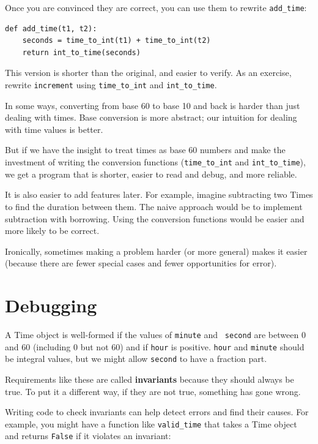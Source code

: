 \documentclass[10pt]{book}
\begin{document}
Once you are convinced they are correct, you can use them to 
rewrite \verb"add_time":

\begin{verbatim}
def add_time(t1, t2):
    seconds = time_to_int(t1) + time_to_int(t2)
    return int_to_time(seconds)
\end{verbatim}
%
This version is shorter than the original, and easier to verify.  As
an exercise, rewrite {\tt increment} using \verb"time_to_int" and
\verb"int_to_time".

In some ways, converting from base 60 to base 10 and back is harder
than just dealing with times.  Base conversion is more abstract; our
intuition for dealing with time values is better.

But if we have the insight to treat times as base 60 numbers and make
the investment of writing the conversion functions (\verb"time_to_int"
and \verb"int_to_time"), we get a program that is shorter, easier to
read and debug, and more reliable.

It is also easier to add features later.  For example, imagine
subtracting two Times to find the duration between them.  The
naive approach would be to implement subtraction with borrowing.
Using the conversion functions would be easier and more likely to be
correct.

Ironically, sometimes making a problem harder (or more general) makes it
easier (because there are fewer special cases and fewer opportunities
for error).


\section{Debugging}

A Time object is well-formed if the values of {\tt minute} and {\tt
second} are between 0 and 60 (including 0 but not 60) and if 
{\tt hour} is positive.  {\tt hour} and {\tt minute} should be
integral values, but we might allow {\tt second} to have a
fraction part.

Requirements like these are called {\bf invariants} because
they should always be true.  To put it a different way, if they
are not true, something has gone wrong.

Writing code to check invariants can help detect errors
and find their causes.  For example, you might have a function
like \verb"valid_time" that takes a Time object and returns
{\tt False} if it violates an invariant:
\end{document}
